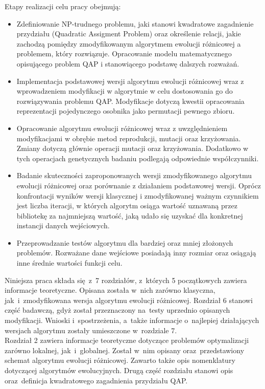 Etapy realizacji celu pracy obejmują:\\
\begin{itemize}
\item Zdefiniowanie NP-trudnego problemu, jaki stanowi kwadratowe zagadnienie przydziału (Quadratic Assigment Problem) oraz określenie relacji, jakie zachodzą pomiędzy zmodyfikowanym algorytmem ewolucji różnicowej a problemem, który rozwiązuje. Opracowanie modelu matematycznego opisującego problem QAP i stanowiącego podstawę dalszych rozważań.\\
\item Implementacja podstawowej wersji algorytmu ewolucji różnicowej wraz z wprowadzeniem modyfikacji w algorytmie w celu dostosowania go do rozwiązywania problemu QAP. Modyfikacje dotyczą kwestii opracowania reprezentacji pojedynczego osobnika jako permutacji pewnego zbioru.\\
\item Opracowanie algorytmu ewolucji różnicowej wraz z uwzględnieniem modyfikacjami w obrębie metod reprodukcji, mutacji oraz krzyżowania. Zmiany dotyczą głównie operacji mutacji oraz krzyżowania. Dodatkowo w tych operacjach genetycznych badaniu podlegają odpowiednie współczynniki. \\
\item Badanie skuteczności zaproponowanych wersji zmodyfikowanego algorytmu ewolucji różnicowej oraz porównanie z działaniem podstawowej wersji. Oprócz konfrontacji wyników wersji klasycznej i zmodyfikowanej ważnym czynnikiem jest liczba iteracji, w których algorytm osiąga wartość uznawaną przez bibliotekę \cite{qaplib} za najmniejszą wartość, jaką udało się uzyskać dla konkretnej instancji danych wejściowych.\\ 
\item Przeprowadzanie testów algorytmu dla bardziej oraz mniej złożonych problemów. Rozważane dane wejściowe posiadają inny rozmiar oraz osiągają inne średnie wartości funkcji celu. 
\end{itemize}
Niniejsza praca składa się~z~7 rozdziałów, z~których 5 początkowych zawiera informacje teoretyczne. Opisana została w~nich zarówno klasyczna, jak~i~zmodyfikowana wersja algorytmu ewolucji różnicowej. Rozdział 6 stanowi część badawczą, gdyż został przeznaczony na~testy uprzednio opisanych modyfikacji. Wnioski i~spostrzeżenia, a~także informacje o~najlepiej działających wersjach algorytmu zostały umieszczone w~rozdziale 7.\\
Rozdział 2 zawiera informacje teoretyczne dotyczące problemów optymalizacji zarówno lokalnej, jak~i~globalnej. Został w~nim opisany oraz~przedstawiony schemat algorytmu ewolucji różnicowej. Zawarto także opis nomenklatury dotyczącej algorytmów ewolucyjnych. Drugą część rozdziału stanowi opis oraz~definicja kwadratowego zagadnienia przydziału QAP.\\
